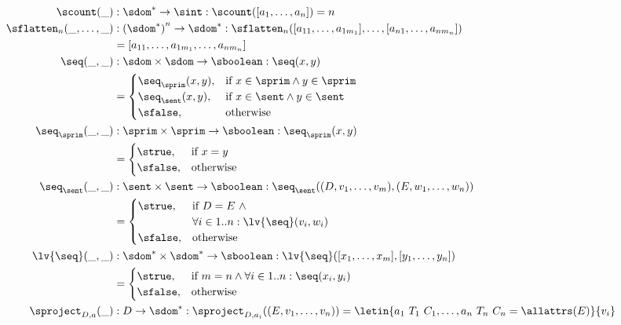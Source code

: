 \begin{align*}
\scount(\_) &: \sdom^{*} \to \sint : \scount([a_1, \dots, a_n]) = n \\
\sflatten_n(\_, \dots, \_) &: \left(\sdom^{*}\right)^n \to \sdom^{*} : \sflatten_n([a_{11}, \dots, a_{1m_1}], \dots, [a_{n1}, \dots, a_{nm_n}]) \\
&= [a_{11}, \dots, a_{1m_1}, \dots, a_{nm_n}] \\
\seq(\_, \_) &: \sdom \times \sdom \to \sboolean : \seq(x, y) \\
&= \begin{cases}
\seq_\sprim(x, y), & \text{if } x \in \sprim \land y \in \sprim \\
\seq_\sent(x, y), & \text{if } x \in \sent \land y \in \sent \\
\sfalse, & \text{otherwise}
\end{cases} \\
\seq_\sprim(\_, \_) &: \sprim \times \sprim \to \sboolean : \seq_\sprim(x, y) \\
&= \begin{cases}
\strue, & \text{if } x = y \\
\sfalse, & \text{otherwise}
\end{cases} \\
\seq_\sent(\_, \_) &: \sent \times \sent \to \sboolean : \seq_\sent((D, v_1, \dots, v_m), (E, w_1, \dots, w_n)) \\
&= \begin{cases}
\strue, & \text{if } D = E~\land \\
& \forall i \in 1..n: \lv{\seq}(v_{i}, w_{i}) \\
\sfalse, & \text{otherwise}
\end{cases} \\
\lv{\seq}(\_, \_) &: \sdom^{*} \times \sdom^{*} \to \sboolean : \lv{\seq}([x_1, \dots, x_m], [y_1, \dots, y_n]) \\
&= \begin{cases}
\strue, & \text{if } m = n \land \forall i\in 1..n: \seq(x_i, y_i) \\
\sfalse, & \text{otherwise}
\end{cases} \\
\sproject_{D, a}(\_) &: D \to \sdom^{*} : \sproject_{D, a_i}((E, v_1, \dots, v_n)) = \letin{a_1\ T_1\ C_1, \dots, a_n\ T_n\ C_n = \allattrs(E)}{v_i}
\end{align*}
